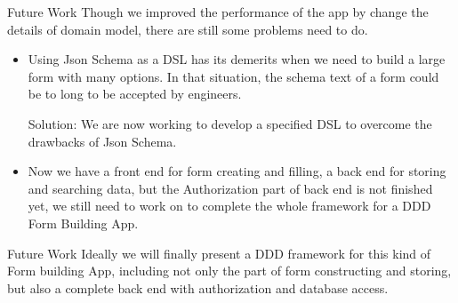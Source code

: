 \documentclass{beamer}
\begin{document}
\begin{frame}{Future Work}
Though we improved the performance of the app by change the details of domain model, there are still some problems need to do.
\begin{itemize}
    \item <1-> Using Json Schema as a DSL has its demerits when we need to build a large form with many options. In that situation, the schema text of a form could be to long to be accepted by engineers. 
    
    Solution: We are now working to develop a specified DSL to overcome the drawbacks of Json Schema.
        
    \item <2-> Now we have a front end for form creating and filling, a back end for storing and searching data, but the Authorization part of back end is not finished yet, we still need to work on to complete the whole framework for a DDD Form Building App.
    
\end{itemize}

\end{frame}

\begin{frame}{Future Work}
Ideally we will finally present a DDD framework for this kind of Form building App, including not only the part of form constructing and storing, but also a complete back end with authorization and database access.
\end{frame}

\begin{frame}
   
\end{frame}
\end{document}
